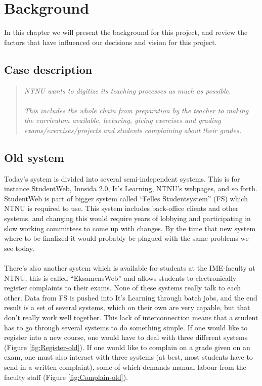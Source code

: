 \section{Background}
In this chapter we will present the background for this project, and review the factors that have
influenced our decisions and vision for this project.

\subsection{Case description}

\begin{quotation}
  \em\noindent NTNU wants to digitize its teaching processes as much as possible.\\\\
   This includes the whole chain from preparation by the teacher to making the curriculum available, lecturing, giving exercises and grading exams/exercises/projects and students complaining about their grades.
\end{quotation}

\subsection{Old system}
Today's system is divided into several semi-independent systems. This is for instance StudentWeb, Innsida 2.0, It's Learning, NTNU's webpages, and so forth. 
StudentWeb is part of bigger system called ``Felles Studentsystem'' (FS) which NTNU is required to use. This system includes back-office clients and other systems, and changing this
would require years of lobbying and participating in slow working committees to come up with changes. By the time that new system where to be finalized it would probably be plagued with the same problems we see today.
~\\\\
 There's also another system which is available for students at the IME-faculty at NTNU, this is called ``EksamensWeb'' and allows students to electronically register complaints to 
 their exams. None of these systems really talk to each other. Data from FS is pushed into It's Learning through batch jobs, and the end result is a set of several systems, which on their own are very capable, but that don't really work well together.  
 This lack of interconnection means that a student has to go through several systems to do something simple. If one would like to register into a new course, one would have to deal with three different systems (Figure \ref{fig:Register-old}). If one would like to complain on a grade given on an exam, one must also interact with three systems (at best, most students have to send in a written complaint), some of which demands manual labour from the faculty staff (Figure \ref{fig:Complain-old}).

